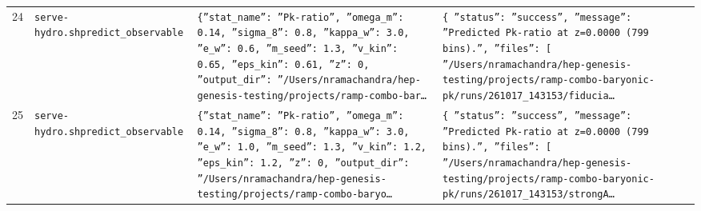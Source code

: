 \documentclass[11pt,a4paper]{article}
\begin{document}
\begin{longtable}{@{}p{}p{}p{}p{}@{}}
24 & \texttt{serve-hydro.sh}\newline\texttt{predict\_\allowbreak{}observable} & \texttt{\{''stat\_\allowbreak{}name'':\allowbreak{} ''Pk-ratio'',\allowbreak{} ''omega\_\allowbreak{}m'':\allowbreak{} 0.14,\allowbreak{} ''sigma\_\allowbreak{}8'':\allowbreak{} 0.8,\allowbreak{} ''kappa\_\allowbreak{}w'':\allowbreak{} 3.0,\allowbreak{} ''e\_\allowbreak{}w'':\allowbreak{} 0.6,\allowbreak{} ''m\_\allowbreak{}seed'':\allowbreak{} 1.3,\allowbreak{} ''v\_\allowbreak{}kin'':\allowbreak{} 0.65,\allowbreak{} ''eps\_\allowbreak{}kin'':\allowbreak{} 0.61,\allowbreak{} ''z'':\allowbreak{} 0,\allowbreak{} ''output\_\allowbreak{}dir'':\allowbreak{} ''/\allowbreak{}Users/\allowbreak{}nramachandra/\allowbreak{}hep-genesis-testing/\allowbreak{}projects/\allowbreak{}ramp-combo-bar\ldots{}\allowbreak{}} & \texttt{\{   ''status'':\allowbreak{} ''success'',\allowbreak{}   ''message'':\allowbreak{} ''Predicted Pk-ratio at z=\allowbreak{}0.0000 (799 bins)\allowbreak{}.'',\allowbreak{}   ''files'':\allowbreak{} [     ''/\allowbreak{}Users/\allowbreak{}nramachandra/\allowbreak{}hep-genesis-testing/\allowbreak{}projects/\allowbreak{}ramp-combo-baryonic-pk/\allowbreak{}runs/\allowbreak{}261017\_\allowbreak{}143153/\allowbreak{}fiducia\ldots{}\allowbreak{}} \\
25 & \texttt{serve-hydro.sh}\newline\texttt{predict\_\allowbreak{}observable} & \texttt{\{''stat\_\allowbreak{}name'':\allowbreak{} ''Pk-ratio'',\allowbreak{} ''omega\_\allowbreak{}m'':\allowbreak{} 0.14,\allowbreak{} ''sigma\_\allowbreak{}8'':\allowbreak{} 0.8,\allowbreak{} ''kappa\_\allowbreak{}w'':\allowbreak{} 3.0,\allowbreak{} ''e\_\allowbreak{}w'':\allowbreak{} 1.0,\allowbreak{} ''m\_\allowbreak{}seed'':\allowbreak{} 1.3,\allowbreak{} ''v\_\allowbreak{}kin'':\allowbreak{} 1.2,\allowbreak{} ''eps\_\allowbreak{}kin'':\allowbreak{} 1.2,\allowbreak{} ''z'':\allowbreak{} 0,\allowbreak{} ''output\_\allowbreak{}dir'':\allowbreak{} ''/\allowbreak{}Users/\allowbreak{}nramachandra/\allowbreak{}hep-genesis-testing/\allowbreak{}projects/\allowbreak{}ramp-combo-baryo\ldots{}\allowbreak{}} & \texttt{\{   ''status'':\allowbreak{} ''success'',\allowbreak{}   ''message'':\allowbreak{} ''Predicted Pk-ratio at z=\allowbreak{}0.0000 (799 bins)\allowbreak{}.'',\allowbreak{}   ''files'':\allowbreak{} [     ''/\allowbreak{}Users/\allowbreak{}nramachandra/\allowbreak{}hep-genesis-testing/\allowbreak{}projects/\allowbreak{}ramp-combo-baryonic-pk/\allowbreak{}runs/\allowbreak{}261017\_\allowbreak{}143153/\allowbreak{}strongA\ldots{}\allowbreak{}} \\

\end{longtable}
\end{document}
